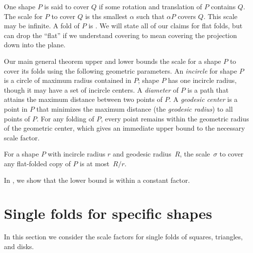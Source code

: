 \documentclass[11pt]{article}
\begin{document}
One shape $P$ is said to cover $Q$ if some rotation and translation of $P$ contains
$Q$. The scale for $P$ to cover $Q$ is ths smallest $\alpha$ such that
$\alpha P$ covers $Q$.  This scale may be infinite. 
A fold of $P$ is .  We will state all of our claims
for flat folds, but can drop the ``flat'' if we understand covering to
mean covering the projection down into the plane. 

Our main general theorem upper and lower bounds the scale for a shape $P$ to cover its folds using
the following geometric parameters. 
An {\it incircle} for shape $P$ is a circle of maximum radius contained in
$P$; shape $P$ has one incircle radius, though it may have a set of
incircle centers.
A {\it diameter} of $P$ is a path that attains the maximum distance
between two points of $P$.   A {\it geodesic center} is a point in $P$ that
minimizes the maximum distance (the {\it geodesic radius}) to all
points of $P$. 
For any folding of $P$, every point remains within the
geometric radius of the geometric center, which gives an immediate
upper bound to the necessary scale factor.  
\begin{lemma}\label{lem:ub}
For a shape $P$ with incircle radius $r$ and geodesic radius~$R$, 
the scale~$\sigma$ to cover any flat-folded copy of $P$ is at most~$R/r$.
\end{lemma}
In , we show
that the lower bound is within a constant factor.

\section{Single folds for specific shapes}

In this section we consider the scale factors for single folds of
squares, triangles, and disks.  
\end{document}
